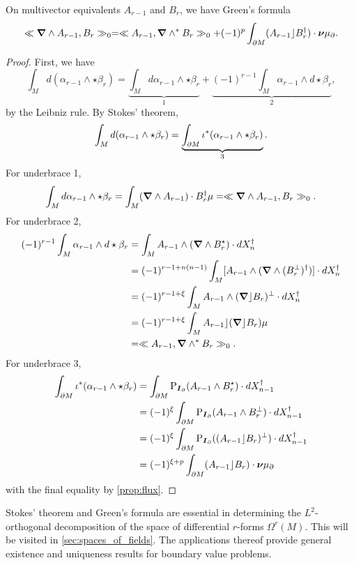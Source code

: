 \begin{proposition}
On multivector equivalents $A_{r-1}$ and $B_r$, we have Green's formula
\begin{equation}
\ll \boldsymbol{\nabla} \wedge A_{r-1}, B_r\gg_0 = \ll A_{r-1}, \boldsymbol{\nabla} \wedge^* B_r\gg_0 + (-1)^{p} \int_{\partial M} (A_{r-1}\rfloor B_r^\dagger) \cdot \boldsymbol{\nu} \mu_\partial.
\end{equation}
\end{proposition}
\begin{proof}
First, we have
\begin{equation}
\int_M d(\alpha_{r-1} \wedge \star \beta_r) = \underbrace{\int_M d\alpha_{r-1} \wedge \star \beta_r}_{1} + \underbrace{(-1)^{r-1} \int_M \alpha_{r-1} \wedge d \star \beta_r}_{2},
\end{equation} 
by the Leibniz rule. By Stokes' theorem,
\begin{equation}
\int_M d(\alpha_{r-1} \wedge \star \beta_r) = \underbrace{\int_{\partial M} \iota^*(\alpha_{r-1} \wedge \star \beta_r)}_{3}.
\end{equation}
For underbrace 1,
\begin{equation}
\int_M d\alpha_{r-1} \wedge \star \beta_r = \int_M (\boldsymbol{\nabla} \wedge A_{r-1}) \cdot B_r^\dagger \mu = \ll \boldsymbol{\nabla} \wedge A_{r-1}, B_r\gg_0.
\end{equation}
For underbrace 2,
\begin{align}
    (-1)^{r-1}\int_M \alpha_{r-1} \wedge d \star \beta_r  &= \int_M A_{r-1} \wedge (\boldsymbol{\nabla} \wedge B_r^\star) \cdot dX_n^\dagger\\
    &= (-1)^{r-1+n(n-1)} \int_M [A_{r-1} \wedge (\boldsymbol{\nabla} \wedge (B_r^\perp)^\dagger)] \cdot dX_n^\dagger\\
    &= (-1)^{r-1 + \xi} \int_M A_{r-1} \wedge (\boldsymbol{\nabla} \rfloor B_r)^\perp \cdot dX_n^\dagger\\
    &= (-1)^{r-1 + \xi} \int_M A_{r-1} \rfloor (\boldsymbol{\nabla} \rfloor B_r) \mu\\
    &= \ll A_{r-1}, \boldsymbol{\nabla} \wedge^* B_r\gg_0.
\end{align}
For underbrace 3,
\begin{align}
\int_{\partial M} \iota^*(\alpha_{r-1} \wedge \star \beta_r) &= \int_{\partial M} \operatorname{P}_{\boldsymbol{I}_\partial} (A_{r-1} \wedge B_r^\star) \cdot dX_{n-1}^\dagger\\
&= (-1)^{\xi} \int_{\partial M} \operatorname{P}_{\boldsymbol{I}_\partial} (A_{r-1} \wedge B_r^\perp) \cdot dX_{n-1}^\dagger\\
&= (-1)^{\xi} \int_{\partial M} \operatorname{P}_{\boldsymbol{I}_\partial}( (A_{r-1} \rfloor B_r)^\perp) \cdot dX_{n-1}^\dagger\\
&= (-1)^{\xi+p} \int_{\partial M} (A_{r-1}\rfloor B_r) \cdot \boldsymbol{\nu} \mu_\partial 
\end{align}
with the final equality by \cref{prop:flux}.
\end{proof}
Stokes' theorem and Green's formula are essential in determining the $L^2$-orthogonal decomposition of the space of differential $r$-forms $\Omega^r(M)$. This will be visited in \cref{sec:spaces_of_fields}. The applications thereof provide general existence and uniqueness results for boundary value problems.

